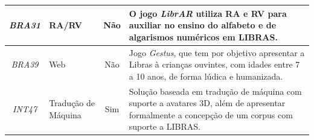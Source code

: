\begin{small}
\begin{longtable}{c|>{\centering\arraybackslash}p{2.75cm}|c|p{10cm}}
\textit{BRA31} & RA/RV & Não & O jogo \textit{LibrAR} utiliza RA e RV para auxiliar no ensino do alfabeto e de algarismos numéricos em LIBRAS. \\ \hline
\textit{BRA39} & Web & Não & Jogo \textit{Gestus}, que tem por objetivo apresentar a Libras à crianças ouvintes, com idades entre 7 a 10 anos, de forma lúdica e humanizada. \\ \hline
\textit{INT47} & Tradução de Máquina & Sim & Solução baseada em tradução de máquina com suporte a avatares 3D, além de apresentar formalmente a concepção de um corpus com suporte a LIBRAS. \\ \hline

\end{longtable}
\end{small}
